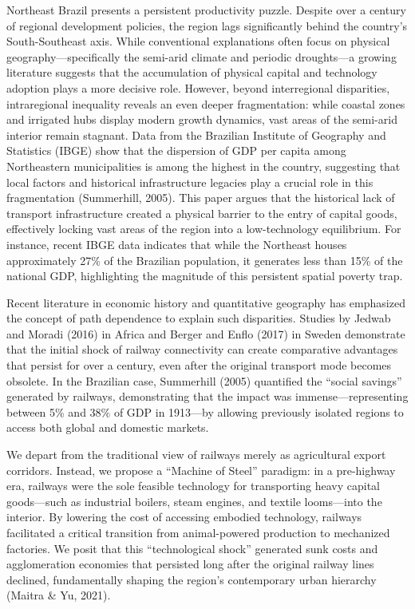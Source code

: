 \documentclass[11pt, a4paper]{article}
\begin{document}
Northeast Brazil presents a persistent productivity puzzle. Despite over a century of regional development policies, the region lags significantly behind the country's South-Southeast axis. While conventional explanations often focus on physical geography---specifically the semi-arid climate and periodic droughts---a growing literature suggests that the accumulation of physical capital and technology adoption plays a more decisive role. However, beyond interregional disparities, intraregional inequality reveals an even deeper fragmentation: while coastal zones and irrigated hubs display modern growth dynamics, vast areas of the semi-arid interior remain stagnant. Data from the Brazilian Institute of Geography and Statistics (IBGE) show that the dispersion of GDP per capita among Northeastern municipalities is among the highest in the country, suggesting that local factors and historical infrastructure legacies play a crucial role in this fragmentation (Summerhill, 2005). This paper argues that the historical lack of transport infrastructure created a physical barrier to the entry of capital goods, effectively locking vast areas of the region into a low-technology equilibrium. For instance, recent IBGE data indicates that while the Northeast houses approximately 27\% of the Brazilian population, it generates less than 15\% of the national GDP, highlighting the magnitude of this persistent spatial poverty trap.

Recent literature in economic history and quantitative geography has emphasized the concept of path dependence to explain such disparities. Studies by Jedwab and Moradi (2016) in Africa and Berger and Enflo (2017) in Sweden demonstrate that the initial shock of railway connectivity can create comparative advantages that persist for over a century, even after the original transport mode becomes obsolete. In the Brazilian case, Summerhill (2005) quantified the ``social savings'' generated by railways, demonstrating that the impact was immense---representing between 5\% and 38\% of GDP in 1913---by allowing previously isolated regions to access both global and domestic markets.

We depart from the traditional view of railways merely as agricultural export corridors. Instead, we propose a ``Machine of Steel'' paradigm: in a pre-highway era, railways were the sole feasible technology for transporting heavy capital goods---such as industrial boilers, steam engines, and textile looms---into the interior. By lowering the cost of accessing embodied technology, railways facilitated a critical transition from animal-powered production to mechanized factories. We posit that this ``technological shock'' generated sunk costs and agglomeration economies that persisted long after the original railway lines declined, fundamentally shaping the region's contemporary urban hierarchy (Maitra \& Yu, 2021).
\end{document}
